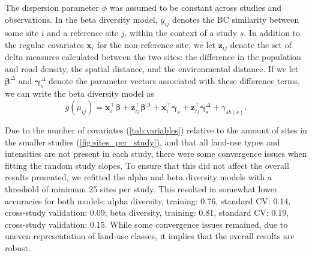 The dispersion parameter $\phi$ was assumed to be constant across studies and observations. In the beta diversity model, $y_{ij}$ denotes the BC similarity between some site $i$ and a reference site $j$, within the context of a study $s$. In addition to the regular covariates $\mathbf{x}_i$ for the non-reference site, we let $\mathbf{z}_{ij}$ denote the set of delta measures calculated between the two sites: the difference in the population and road density, the spatial distance, and the environmental distance. If we let $\boldsymbol{\beta}^\Delta$ and $\boldsymbol{\gamma}_s^\Delta$ denote the parameter vectors associated with these difference terms, we can write the beta diversity model as
\vspace{0.25\baselineskip}
\begin{equation*}
    g(\mu_{ij}) = \mathbf{x}_i^\top \boldsymbol{\beta} + \mathbf{z}_{ij}^\top \boldsymbol{\beta}^\Delta + \mathbf{x}_i^\top \boldsymbol{\gamma}_s + \mathbf{z}_{ij}^\top \boldsymbol{\gamma}_s^\Delta + \gamma_{sb(s)}.
\end{equation*}

Due to the number of covariates (\autoref{tab:variables}) relative to the amount of sites in the smaller studies (\autoref{fig:sites_per_study}), and that all land-use types and intensities are not present in each study, there were some convergence issues when fitting the random study slopes. To ensure that this did not affect the overall results presented, we refitted the alpha and beta diversity models with a threshold of minimum 25 sites per study. This resulted in somewhat lower accuracies for both models: alpha diversity, training: 0.76, standard CV: 0.14, cross-study validation: 0.09; beta diversity, training: 0.81, standard CV: 0.19, cross-study validation: 0.15. While some convergence issues remained, due to uneven representation of land-use classes, it implies that the overall results are robust.

\vspace{\baselineskip}
